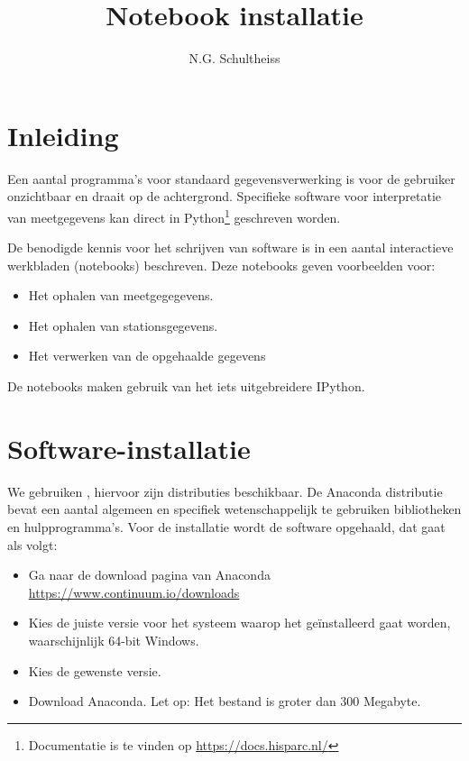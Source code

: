 

\title{Notebook installatie}
\author{N.G. Schultheiss}



\maketitle

\section{Inleiding}

Een aantal programma's voor standaard \hisparc gegevensverwerking is voor de gebruiker onzichtbaar
en draait op de achtergrond. Specifieke software voor interpretatie van meetgegevens kan direct in
Python\footnote{Documentatie is te vinden op \url{https://docs.hisparc.nl/}} geschreven worden.

De benodigde kennis voor het schrijven van \python software is in een aantal interactieve werkbladen
(notebooks) beschreven. Deze notebooks geven voorbeelden voor:
\begin{itemize}
\item Het ophalen van meetgegegevens.
\item Het ophalen van stationsgegevens.
\item Het verwerken van de opgehaalde gegevens
\end{itemize}
De notebooks maken gebruik van het iets uitgebreidere IPython.

\section{Software-installatie}

We gebruiken \python, hiervoor zijn distributies beschikbaar. De Anaconda distributie bevat een aantal algemeen en specifiek wetenschappelijk te gebruiken bibliotheken en hulpprogramma's. Voor de installatie wordt de software opgehaald, dat gaat als volgt:

\begin{itemize}
\item Ga naar de download pagina van Anaconda \url{https://www.continuum.io/downloads}
\item Kies de juiste versie voor het systeem waarop het geïnstalleerd gaat worden, waarschijnlijk 64-bit Windows.
\item Kies de gewenste \python versie.
\item Download Anaconda. Let op: Het bestand is groter dan 300 Megabyte.
\end{itemize}

